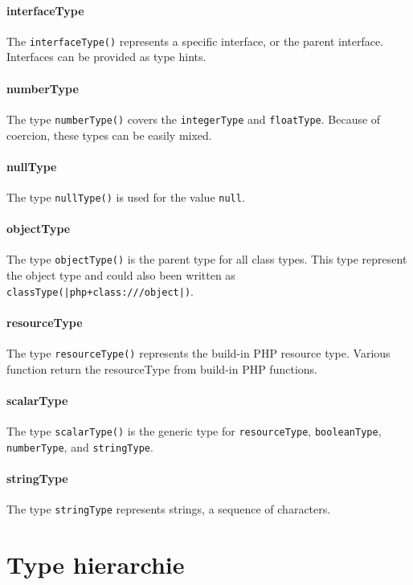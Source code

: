 \documentclass[../main.tex]{subfiles}
\begin{document}
    \paragraph{interfaceType}
    The \texttt{interfaceType()} represents a specific interface, or the parent interface.
    Interfaces can be provided as type hints.
    
    \paragraph{numberType}
    The type \texttt{numberType()} covers the \texttt{integerType} and \texttt{floatType}.
    Because of coercion, these types can be easily mixed.
    
    \paragraph{nullType}
    The type \texttt{nullType()} is used for the value \texttt{null}.
    
    \paragraph{objectType}
    The type \texttt{objectType()} is the parent type for all class types.
    This type represent the object type and could also been written as \texttt{classType(|php+class:///object|)}.
    
    \paragraph{resourceType}
    The type \texttt{resourceType()} represents the build-in PHP resource type.
    Various function return the resourceType from build-in PHP functions.
    
    \paragraph{scalarType}
    The type \texttt{scalarType()} is the generic type for \texttt{resourceType}, \texttt{booleanType}, \texttt{numberType}, and \texttt{stringType}.
    
    \paragraph{stringType}
    The type \texttt{stringType} represents strings, a sequence of characters.
    
    
    \section{Type hierarchie}\label{sec:type_hierarchie}
    
\end{document}
